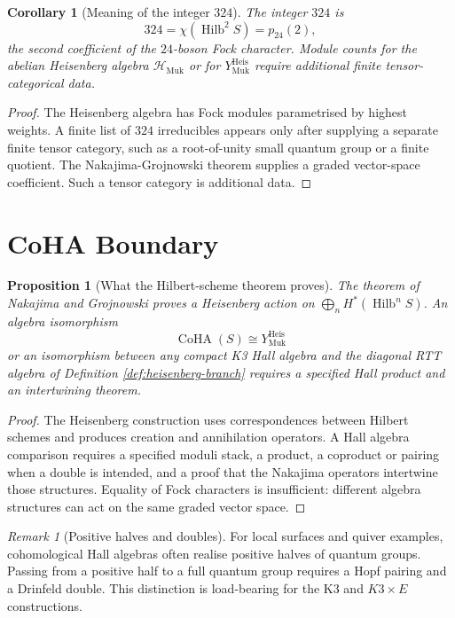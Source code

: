 \documentclass[11pt]{article}
\newtheorem{proposition}[theorem]{Proposition}
\newtheorem{corollary}[theorem]{Corollary}
\theoremstyle{definition}
\theoremstyle{remark}
\newtheorem{remark}[theorem]{Remark}
\DeclareMathOperator{\CoHA}{CoHA}
\DeclareMathOperator{\Hilb}{Hilb}
\newcommand{\Hmuk}{\mathcal{H}_{\mathrm{Muk}}}
\newcommand{\YHeis}{Y^{\mathrm{Heis}}_{\mathrm{Muk}}}
\begin{document}
\begin{corollary}[Meaning of the integer $324$]
\label{cor:meaning-324}
The integer $324$ is
\[
  324=\chi(\Hilb^2 S)=p_{24}(2),
\]
the second coefficient of the $24$-boson Fock character. Module counts
for the abelian Heisenberg algebra $\Hmuk$ or for $\YHeis$ require
additional finite tensor-categorical data.
\end{corollary}

\begin{proof}
The Heisenberg algebra has Fock modules parametrised by highest
weights. A finite list of $324$ irreducibles appears only after
supplying a separate finite tensor category, such as a root-of-unity
small quantum group or a finite quotient. The Nakajima-Grojnowski
theorem supplies a graded vector-space coefficient. Such a tensor
category is additional data.
\end{proof}

\section{CoHA Boundary}
\label{sec:coha-boundary}

\begin{proposition}[What the Hilbert-scheme theorem proves]
\label{prop:coha-boundary}
The theorem of Nakajima and Grojnowski proves a Heisenberg action on
$\bigoplus_n H^*(\Hilb^n S)$. An algebra isomorphism
\[
  \CoHA(S) \cong \YHeis
\]
or an isomorphism between any compact K3 Hall algebra and the diagonal
RTT algebra of Definition \ref{def:heisenberg-branch} requires a
specified Hall product and an intertwining theorem.
\end{proposition}

\begin{proof}
The Heisenberg construction uses correspondences between Hilbert
schemes and produces creation and annihilation operators. A Hall
algebra comparison requires a specified moduli stack, a product, a
coproduct or pairing when a double is intended, and a proof that the
Nakajima operators intertwine those structures. Equality of Fock
characters is insufficient: different algebra structures can act on
the same graded vector space.
\end{proof}

\begin{remark}[Positive halves and doubles]
\label{rem:positive-halves-doubles}
For local surfaces and quiver examples, cohomological Hall algebras
often realise positive halves of quantum groups. Passing from a
positive half to a full quantum group requires a Hopf pairing and a
Drinfeld double. This distinction is load-bearing for the K3 and
$K3\times E$ constructions.
\end{remark}
\end{document}
